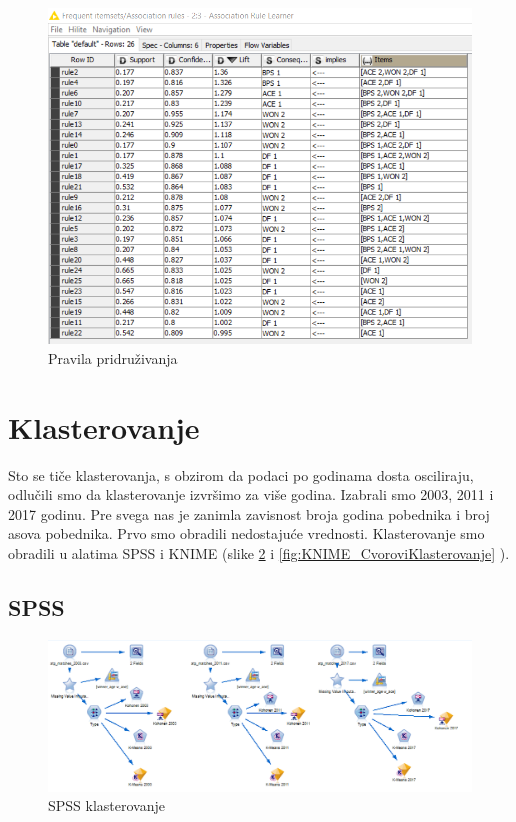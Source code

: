 \documentclass[a4paper]{article}
\begin{document}
\begin{figure}[h!]
	\begin{center}
		\includegraphics[scale=0.6]{KNIME_project/PravilaPridruzivanja/rule_learner_2009}
	\end{center}
	\caption{Pravila pridruživanja}
	\label{fig:rule_learner}
\end{figure}

\section{Klasterovanje}

Sto se tiče klasterovanja, s obzirom da podaci po godinama dosta osciliraju, odlučili smo da klasterovanje izvršimo za više godina. Izabrali smo 2003, 2011 i 2017 godinu. Pre svega nas je zanimla zavisnost broja godina pobednika i broj asova pobednika. Prvo smo obradili nedostajuće vrednosti. Klasterovanje smo obradili u alatima SPSS i KNIME (slike \ref{fig:SPSS_CvoroviKlasterovanje} i \ref{fig:KNIME_CvoroviKlasterovanje} ). 

\subsection{SPSS}

\begin{figure}[H]
	\begin{center}
		\includegraphics[scale=0.60]{Klasterovanje/SPSS_Cvorovi.png}
	\end{center}
	\caption{SPSS klasterovanje}
	\label{fig:SPSS_CvoroviKlasterovanje}
\end{figure}
\end{document}
